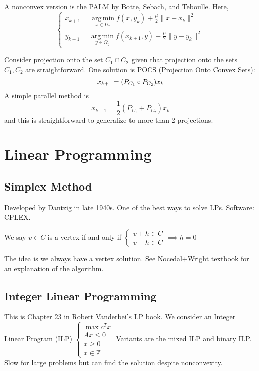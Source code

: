 \documentclass[english, 11pt]{article}
\DeclareMathOperator*{\argmin}{arg\,min}
\begin{document}
A nonconvex version is the PALM by Botte, Sebach, and Teboulle. Here, 
 \[
 \begin{cases}
 x_{k+1} = \argmin \limits_{x \in \Omega_x} f(x,y_k) + \frac{\mu}{2} \|x-x_k\|^2 \\
 y_{k+1} = \argmin \limits_{y \in \Omega_y} f(x_{k+1},y) + \frac{\mu}{2} \|y-y_k\|^2
 \end{cases}
 \]
 
 
 
 \begin{exmp}
 Consider projection onto the set $C_1 \cap C_2$ given that projection onto the sets $C_1,C_2$ are straightforward. One solution is POCS (Projection Onto Convex Sets):
  \[
 x_{k+1} = (P_{C_1} \circ P_{C_2}) x_k \\
 \]
 A simple parallel method is
 \[
 x_{k+1} = \frac{1}{2} ( P_{C_1} + P_{C_2} ) x_k
 \]
 and this is straightforward to generalize to more than 2 projections.
 \end{exmp}

  
  
  
  
 \section{Linear Programming}
 
 \subsection{Simplex Method}
 Developed by Dantzig in late 1940s. One of the best ways to solve LPs. Software: CPLEX.
 
We say $v \in C$ is a vertex if and only if $\begin{cases} v+h \in C \\
v-h \in C 
\end{cases} \implies h =0$

The idea is we always have a vertex solution. See Nocedal+Wright textbook for an explanation of the algorithm.
 
 \subsection{Integer Linear Programming}
 This is Chapter 23 in Robert Vanderbei's LP book. We consider an Integer Linear Program (ILP) $\begin{cases} 
  \max c^T x \\
  Ax \le 0 \\
  x \ge 0 \\
  x \in \mathbb{Z}
    \end{cases}$ Variants are the mixed ILP and binary ILP. Slow for large problems but can find the solution despite nonconvexity.
    
\end{document}
